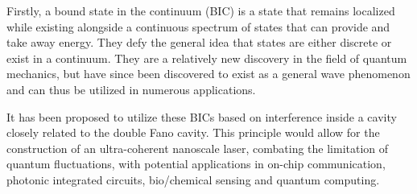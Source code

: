 Firstly, a bound state in the continuum (BIC) is a state that remains localized while existing alongside a continuous spectrum of states that can provide and take away energy. They defy the general idea that states are either discrete or exist in a continuum. They are a relatively new discovery in the field of quantum mechanics, but have since been discovered to exist as a general wave phenomenon and can thus be utilized in numerous applications\cite{Hsu}. 

It has been proposed to utilize these BICs based on interference inside a cavity closely related to the double Fano cavity. This principle would allow for the construction of an ultra-coherent nanoscale laser, combating the limitation of quantum fluctuations, with potential applications in on-chip communication, photonic integrated circuits, bio/chemical sensing and quantum computing\cite{Yu}. 

